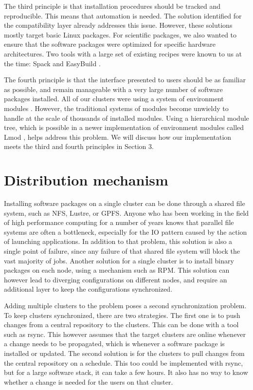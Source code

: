 \documentclass[sigconf]{acmart}
\begin{document}
The third principle is that installation procedures should be tracked and reproducible. This means that automation is needed. The solution identified for the compatibility layer already addresses this issue. However, these solutions mostly target basic Linux packages. For scientific packages, we also wanted to ensure that the software packages were optimized for specific hardware architectures. Two tools with a large set of existing recipes were known to us at the time: Spack\cite{Spack} and EasyBuild \cite{EasyBuild2012,EasyBuild2014,EasyBuild2016}. 

The fourth principle is that the interface presented to users should be as familiar as possible, and remain manageable with a very large number of software packages installed. All of our clusters were using a system of environment modules \cite{Modules1991,Modules1996}. However, the traditional systems of modules become unwieldy to handle at the scale of thousands of installed modules. Using a hierarchical module tree, which is possible in a newer implementation of environment modules called Lmod \cite{Lmod}, helps address this problem. We will discuss how our implementation meets the third and fourth principles in Section 3. 


\section{Distribution mechanism}
Installing software packages on a single cluster can be done through a shared file system, such as NFS, Lustre, or GPFS. Anyone who has been working in the field of high performance computing for a number of years knows that parallel file systems are often a bottleneck, especially for the IO pattern caused by the action of launching applications. In addition to that problem, this solution is also a single point of failure, since any failure of that shared file system will block the vast majority of jobs. Another solution for a single cluster is to install binary packages on each node, using a mechanism such as RPM. This solution can however lead to diverging configurations on different nodes, and require an additional layer to keep the configurations synchronized.  

Adding multiple clusters to the problem poses a second synchronization problem. To keep clusters synchronized, there are two strategies. The first one is to push changes from a central repository to the clusters. This can be done with a tool such as rsync. This however assumes that the target clusters are online whenever a change needs to be propagated, which is whenever a software package is installed or updated. The second solution is for the clusters to pull changes from the central repository on a schedule. This too could be implemented with rsync, but for a large software stack, it can take a few hours. It also has no way to know whether a change is needed for the users on that cluster.
\end{document}
